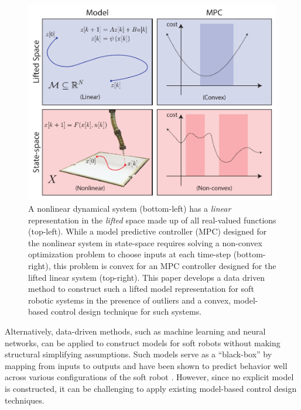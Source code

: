 \begin{figure}
    \centering
    \includegraphics[width=\linewidth]{figures/overview_v8.pdf}
    \caption{A nonlinear dynamical system (bottom-left) has a \emph{linear} representation in the \emph{lifted} space made up of all real-valued functions (top-left). While a model predictive controller (MPC) designed for the nonlinear system in state-space requires solving a non-convex optimization problem to choose inputs at each time-step (bottom-right), this problem is convex for an MPC controller designed for the lifted linear system (top-right). This paper develops a data driven method to construct such a lifted model representation  for soft robotic systems in the presence of outliers and a convex, model-based control design technique for such systems. }
    \vspace*{-0.5cm}
    \label{fig:overview}
\end{figure}

Alternatively, data-driven methods, such as machine learning and neural networks, can be applied to construct models for soft robots without making structural simplifying assumptions.
Such models serve as a ``black-box'' by mapping from inputs to outputs and have been shown to predict behavior well across various configurations of the soft robot  \cite{gillespie2018learning, thuruthel2018model}.
However, since no explicit model is constructed, it can be challenging to apply existing model-based control design techniques.

